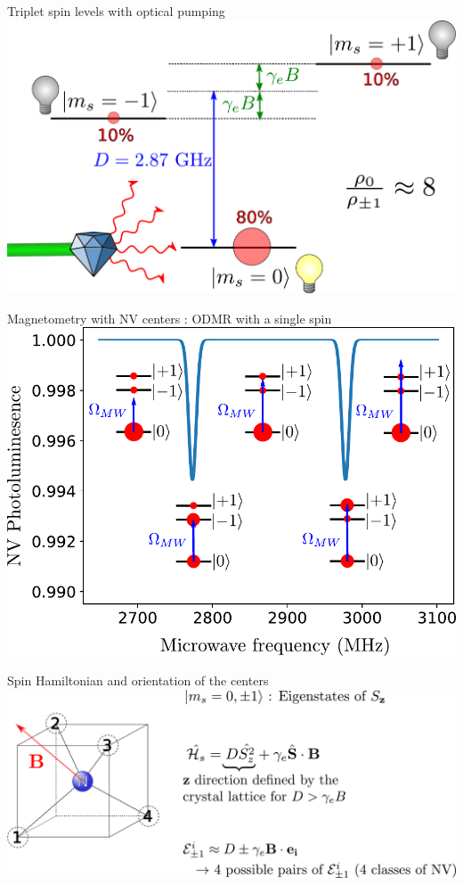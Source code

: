 \documentclass{beamer}
\begin{document}
\begin{frame}{Triplet spin levels with optical pumping}
\includegraphics[scale=.4]{3_niveaux_2}
\end{frame}
\begin{frame}{Magnetometry with NV centers : ODMR with a single spin}%
\includegraphics[scale=.65]{ESR_1spin_simu}
\end{frame}
\begin{frame}{Spin Hamiltonian and orientation of the centers}
\includegraphics[scale=.25]{projection_4_classes}
\end{frame}
\end{document}
